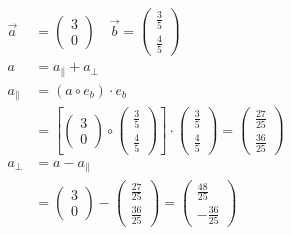 \documentclass[a4paper]{article}
\begin{document}
  \subsection{}
    \begin{align*}
      \vec{a} &=
      \begin{pmatrix}
        3 \\ 0
      \end{pmatrix}
      \quad
      \vec{b} =
      \begin{pmatrix}
        \frac{3}{5} \\ \frac{4}{5}
      \end{pmatrix}
      \\[1em]
      a &= a_\parallel + a_\perp
      \\[1em]
      a_\parallel &= (a \circ e_b) \cdot e_b
      \\[1em]
      &= \left[
      \begin{pmatrix}
        3 \\ 0
      \end{pmatrix}
      \circ
      \begin{pmatrix}
        \frac{3}{5} \\ \frac{4}{5}
      \end{pmatrix}
      \right] \cdot
      \begin{pmatrix}
        \frac{3}{5} \\ \frac{4}{5}
      \end{pmatrix}
      =
      \begin{pmatrix}
        \frac{27}{25} \\ \frac{36}{25}
      \end{pmatrix}
      \\[1em]
      a_\perp &= a - a_\parallel
      \\[1em]
      &=
      \begin{pmatrix}
        3 \\ 0
      \end{pmatrix}
      -
      \begin{pmatrix}
        \frac{27}{25} \\ \frac{36}{25}
      \end{pmatrix}
      =
      \begin{pmatrix}
        \frac{48}{25} \\ -\frac{36}{25}
      \end{pmatrix}
    \end{align*}
\end{document}
